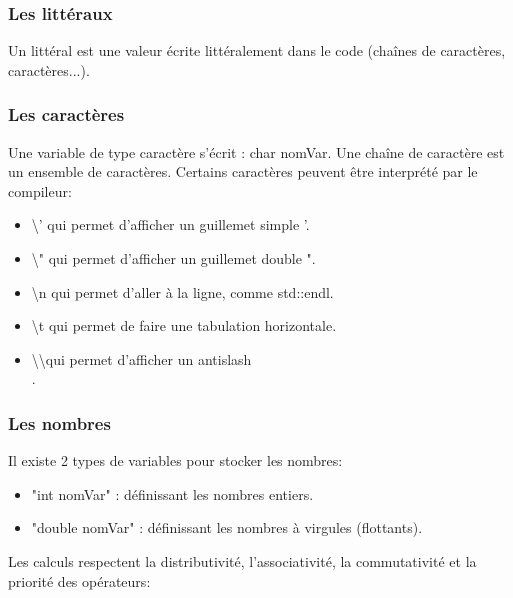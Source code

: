 \documentclass{article}
\begin{document}
\subsubsection{Les littéraux}
Un littéral est une valeur écrite littéralement dans le code (chaînes de caractères, caractères...).

\subsubsection{Les caractères}
Une variable de type caractère s'écrit : char nomVar. Une chaîne de caractère est un ensemble de caractères. Certains caractères peuvent être interprété par le compileur:
\begin{itemize}
    \item \textbackslash ' qui permet d’afficher un guillemet simple '.
    \item \textbackslash " qui permet d’afficher un guillemet double ".
    \item \textbackslash n qui permet d’aller à la ligne, comme std::endl.
    \item \textbackslash t qui permet de faire une tabulation horizontale.
    \item  \textbackslash\textbackslash  qui permet d’afficher un antislash \\.
\end{itemize}{}

\subsubsection{Les nombres}
Il existe 2 types de variables pour stocker les nombres:
\begin{itemize}
    \item "int nomVar" : définissant les nombres entiers.
    \item "double nomVar" : définissant les nombres à virgules (flottants).
\end{itemize}

Les calculs respectent la distributivité, l'associativité, la commutativité et la priorité des opérateurs:
\end{document}
